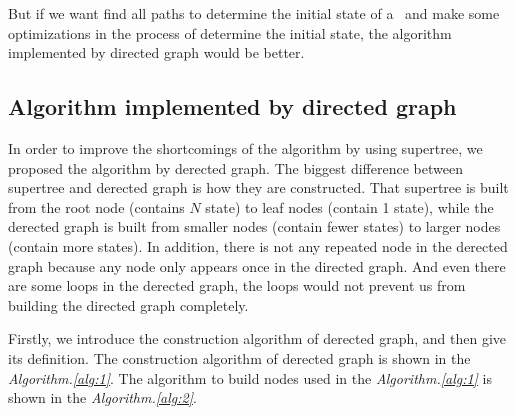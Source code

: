 But if we want find all paths to determine the initial state of a \BCN\ and make some optimizations in the process of determine the initial state, the algorithm implemented by directed graph would be better.
\subsection{Algorithm implemented by directed graph}
In order to improve the shortcomings of the algorithm by using supertree, we proposed the algorithm by derected graph. The biggest difference between supertree and derected graph is how they are constructed. That supertree is built from the root node (contains $N$ state) to leaf nodes (contain 1 state), while the derected graph is built from smaller nodes (contain fewer states) to larger nodes (contain more states). In addition, there is not any repeated node in the derected graph because any node only appears once in the directed graph. And even there are some loops in the derected graph, the loops would not prevent us from building the directed graph completely.

Firstly, we introduce the construction algorithm of derected graph, and then give its definition. The construction algorithm of derected graph is shown in the {\em Algorithm.\ref{alg:1}}. The algorithm to build nodes used in the {\em Algorithm.\ref{alg:1}} is shown in the {\em Algorithm.\ref{alg:2}}.

